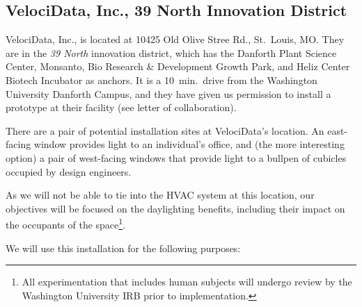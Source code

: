 \subsection{VelociData, Inc., 39 North Innovation District}

VelociData, Inc., is located at 10425 Old Olive Stree Rd., St.~Louis, MO.
They are in the \emph{39 North}
innovation district, which has the Danforth
Plant Science Center, Monsanto, Bio Research \& Development Growth Park,
and Heliz Center Biotech Incubator as anchors. It is a 10~min.~drive from
the Washington University Danforth Campus, and they have given us
permission to install a prototype at their facility (see letter
of collaboration).

There are a pair of potential installation sites at VelociData's location.
An east-facing window provides light to an individual's office, and
(the more interesting option) a pair of west-facing windows that provide
light to a bullpen of cubicles occupied by design engineers.

As we will not be able to tie into the HVAC system at this location, our
objectives will be focused on the daylighting benefits, including their
impact on the occupants of the space\footnote{All experimentation that
includes human subjects will undergo review by the Washington University
IRB prior to implementation.}.

We will use this installation for the following purposes:

